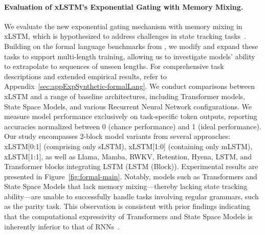 \paragraph{Evaluation of xLSTM's Exponential Gating with Memory Mixing.} We evaluate the new exponential gating mechanism with memory mixing in xLSTM, which is hypothesized to address challenges in state tracking tasks~\citep{Merrill:24, Merrill:23}. Building on the formal language benchmarks from \citet{Deletang:23}, we modify and expand these tasks to support multi-length training, allowing us to investigate models' ability to extrapolate to sequences of unseen lengths. For comprehensive task descriptions and extended empirical results, refer to Appendix~\ref{sec:appExpSynthetic-formalLang}. We conduct comparisons between xLSTM and a range of baseline architectures, including Transformer models, State Space Models, and various Recurrent Neural Network configurations. We measure model performance exclusively on task-specific token outputs, reporting accuracies normalized between 0 (chance performance) and 1 (ideal performance). Our study encompasses 2-block model variants from several approaches: xLSTM[0:1] (comprising only sLSTM), xLSTM[1:0] (containing only mLSTM), xLSTM[1:1], as well as Llama, Mamba, RWKV, Retention, Hyena, LSTM, and Transformer blocks integrating LSTM (LSTM (Block)). Experimental results are presented in Figure~\ref{fig:formal-main}. Notably, models such as Transformers and State Space Models that lack memory mixing—thereby lacking state tracking ability—are unable to successfully handle tasks involving regular grammars, such as the parity task. This observation is consistent with prior findings indicating that the computational expressivity of Transformers and State Space Models is inherently inferior to that of RNNs~\citep{Merrill:24, Merrill:23, Deletang:23}.

